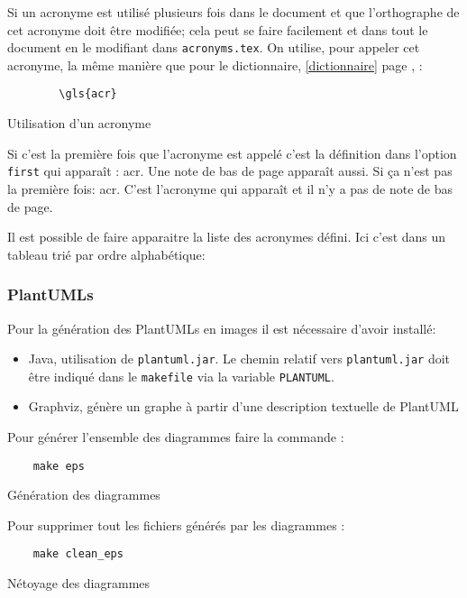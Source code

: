 Si un acronyme est utilisé plusieurs fois dans le document et que l'orthographe de cet acronyme doit être modifiée;
cela peut se faire facilement et dans tout le document en le modifiant dans \verb=acronyms.tex=.
On utilise, pour appeler cet acronyme, la même manière que pour le dictionnaire, \ref{dictionnaire} page \pageref{dictionnaire}, :
\begin{code}
    \begin{verbatim}
        \gls{acr}
\end{verbatim}
    \caption{Utilisation d'un acronyme}
\end{code}

Si c'est la première fois que l'acronyme est appelé c'est la définition dans l'option \verb=first= qui apparaît : \gls{acr}.
Une note de bas de page apparaît aussi. \newline
Si ça n'est pas la première fois: \gls{acr}. C'est l'acronyme qui apparaît et il n'y a pas de note de bas de page.

Il est possible de faire apparaitre la liste des acronymes défini. Ici c'est dans un tableau trié par ordre alphabétique:

\printglossary[type=\acronymtype,style=superheaderborder ,title={Définitions, acronymes et abréviations}]
\glsaddallunused

\subsubsection{PlantUMLs}
Pour la génération des PlantUMLs en images il est nécessaire d'avoir installé:
\begin{itemize}
    \item Java, utilisation de \verb=plantuml.jar=. Le chemin relatif vers
          \verb=plantuml.jar= doit être indiqué dans le \verb=makefile= via la variable \verb=PLANTUML=.
    \item Graphviz, génère un graphe à partir d'une description textuelle de PlantUML
\end{itemize}

Pour générer l'ensemble des diagrammes faire la commande :
\begin{code}
    \begin{verbatim}
    make eps
\end{verbatim}
    \caption{Génération des diagrammes}
\end{code}

Pour supprimer tout les fichiers générés par les diagrammes :
\begin{code}
    \begin{verbatim}
    make clean_eps
\end{verbatim}
    \caption{Nétoyage des diagrammes}
\end{code}

